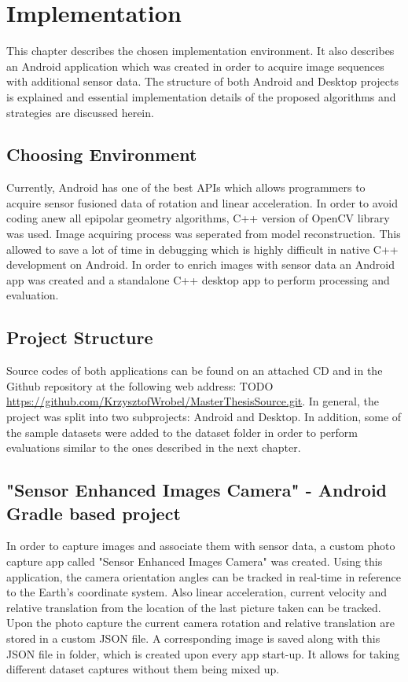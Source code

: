\ifpdf
    \graphicspath{{figures/}{figures/comparisons}}
\else
    \graphicspath{{figures/}{figures/comparisons}}
\fi

\chapter{Implementation} %
This chapter describes the chosen implementation environment. It also describes an Android application which was created in order to acquire image sequences with additional sensor data. The structure of both Android and Desktop projects is explained and essential implementation details of the proposed algorithms and strategies are discussed herein.
\section{Choosing Environment}
Currently, Android has one of the best APIs which allows programmers to acquire sensor fusioned data of rotation and linear acceleration.
In order to avoid coding anew all epipolar geometry algorithms, C++ version of OpenCV library was used. Image acquiring process was seperated from model reconstruction. This allowed to save a lot of time in debugging which is highly difficult in native C++ development on Android. In order to enrich images with sensor data an Android app was created and a standalone C++ desktop app to perform processing and evaluation.
\section{Project Structure} \label{sec:ProjectStructure}
Source codes of both applications can be found on an attached CD and in the Github repository at the following web address: TODO \url{https://github.com/KrzysztofWrobel/MasterThesisSource.git}. In general, the project was split into two subprojects: Android and Desktop. In addition, some of the sample datasets were added to the dataset folder in order to perform evaluations similar to the ones described in the next chapter.
\section{"Sensor Enhanced Images Camera" - Android Gradle based project}
In order to capture images and associate them with sensor data, a custom photo capture app called "Sensor Enhanced Images Camera" was created.
Using this application, the camera orientation angles can be tracked in real-time in reference to the Earth's coordinate system. Also linear acceleration, current velocity and relative translation from the location of the last picture taken can be tracked. 
Upon the photo capture the current camera rotation and relative translation are stored in a custom JSON file. A corresponding image is saved along with this JSON file in folder, which is created upon every app start-up. It allows for taking different dataset captures without them being mixed up.
